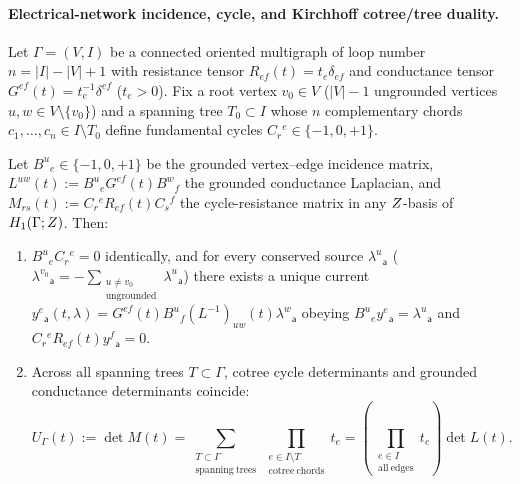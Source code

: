 \paragraph{Electrical-network incidence, cycle, and Kirchhoff cotree/tree duality.}
Let $\Gamma = (V,I)$ be a connected oriented multigraph of loop number $n = |I|-|V|+1$ with resistance tensor $R_{ef}(t) = t_e\delta_{ef}$ and conductance tensor $G^{ef}(t) = t_e^{-1}\delta^{ef}$ ($t_e > 0$). Fix a root vertex $v_0 \in V$ ($|V|-1$ ungrounded vertices $u,w \in V\setminus\{v_0\}$) and a spanning tree $T_0 \subset I$ whose $n$ complementary chords $c_1,\dots,c_n \in I\setminus T_0$ define fundamental cycles $C_r{}^e \in \{-1,0,+1\}$.

\begin{proposition}
\label{prop:kirchhoff-duality}
Let $B^u{}_e \in \{-1,0,+1\}$ be the grounded vertex--edge incidence matrix, $L^{uw}(t) := B^u{}_e G^{ef}(t)B^w{}_f$ the grounded conductance Laplacian, and $M_{rs}(t) := C_r{}^e R_{ef}(t)C_s{}^f$ the cycle-resistance matrix in any $Z$-basis of $H_1(\Gamma;Z)$. Then:
\begin{enumerate}[label=(\arabic*),leftmargin=*]
  \item $B^u{}_e C_r{}^e = 0$ identically, and for every conserved source $\lambda^u{}_{\mathsf{a}}$ ($\lambda^{v_0}{}_{\mathsf{a}} = -\sum_{\substack{u\neq v_0\\\mathrm{ungrounded}}}\lambda^u{}_{\mathsf{a}}$) there exists a unique current $y^e{}_{\mathsf{a}}(t,\lambda) = G^{ef}(t)B^u{}_f(L^{-1})_{uw}(t)\lambda^w{}_{\mathsf{a}}$ obeying $B^u{}_e y^e{}_{\mathsf{a}} = \lambda^u{}_{\mathsf{a}}$ and $C_r{}^e R_{ef}(t)y^f{}_{\mathsf{a}} = 0$.

  \item Across all spanning trees $T \subset \Gamma$, cotree cycle determinants and grounded conductance determinants coincide:
  \begin{equation}
  \label{eq:kirchhoff-tree-cotree}
  U_\Gamma(t) := \det M(t) = \sum_{\substack{T\subset\Gamma\\\mathrm{spanning\ trees}}}\prod_{\substack{e\in I\setminus T\\\mathrm{cotree\ chords}}}t_e = \left(\prod_{\substack{e\in I\\\mathrm{all\ edges}}}t_e\right)\det L(t).
  \end{equation}
\end{enumerate}
\end{proposition}

